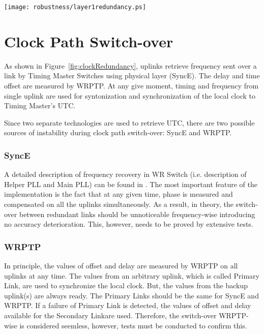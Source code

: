 \begin{center}
	\texttt{[image: robustness/layer1redundancy.ps]}
	\label{fig:clockRedundancy}
\end{center}

\section{Clock Path Switch-over}

As shown in Figure~\ref{fig:clockRedundancy}, uplinks retrieve frequency
sent over a link by Timing Master Switches using physical layer (SyncE). The
delay and time offset are measured by WRPTP. At any give moment,
timing and frequency from single uplink are used for syntonization and
synchronization of the local clock to Timing Master's UTC.

Since two separate technologies are used to retrieve UTC, there are two
possible sources of instability during clock path switch-over: SyncE and WRPTP.

\subsubsection{SyncE}

A detailed description of frequency recovery in WR Switch (i.e. description of
Helper PLL and Main PLL) can be found in \cite{TomekMSc}. The most important
feature of the implementation is the fact that at any given time, phase is
measured and compensated on all the uplinks simultaneously. As a result, in
theory, the switch-over between redundant links should be unnoticeable
frequency-wise introducing no accuracy deterioration. This, however, needs to be
proved by extensive tests.

\subsubsection{WRPTP} 

In principle, the values of offset and delay are measured by WRPTP on all
uplinks at any time. The values from an arbitrary uplink, which is called
Primary Link, are used to synchronize the local clock. But, the values from the
backup uplink(s) are always ready. The Primary Links should be the same
for SyncE and WRPTP. If a failure of Primary Link is detected, the values of
offset and delay available for the Secondary Linkare used. Therefore, the
switch-over WRPTP-wise is considered seemless, however, tests must be conducted
to confirm this.

